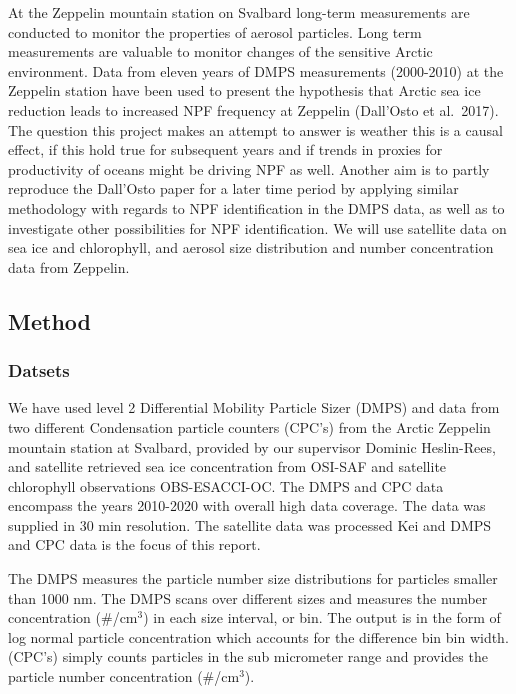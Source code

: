 \documentclass[11pt]{article}
\begin{document}
At the Zeppelin mountain station on Svalbard long-term measurements are
conducted to monitor the properties of aerosol particles. Long term
measurements are valuable to monitor changes of the sensitive Arctic
environment. Data from eleven years of DMPS measurements (2000-2010) at
the Zeppelin station have been used to present the hypothesis that
Arctic sea ice reduction leads to increased NPF frequency at Zeppelin
(Dall'Osto et al.~2017). The question this project makes an attempt to
answer is weather this is a causal effect, if this hold true for
subsequent years and if trends in proxies for productivity of oceans
might be driving NPF as well. Another aim is to partly reproduce the
Dall'Osto paper for a later time period by applying similar methodology
with regards to NPF identification in the DMPS data, as well as to
investigate other possibilities for NPF identification. We will use
satellite data on sea ice and chlorophyll, and aerosol size distribution
and number concentration data from Zeppelin.

    \hypertarget{method}{%
\subsection{Method}\label{method}}

\hypertarget{datsets}{%
\subsubsection{Datsets}\label{datsets}}

We have used level 2 Differential Mobility Particle Sizer (DMPS) and
data from two different Condensation particle counters (CPC's) from the
Arctic Zeppelin mountain station at Svalbard, provided by our supervisor
Dominic Heslin-Rees, and satellite retrieved sea ice concentration from
OSI-SAF and satellite chlorophyll observations OBS-ESACCI-OC. The DMPS
and CPC data encompass the years 2010-2020 with overall high data
coverage. The data was supplied in 30 min resolution. The satellite data
was processed Kei and DMPS and CPC data is the focus of this report.

The DMPS measures the particle number size distributions for particles
smaller than 1000 nm. The DMPS scans over different sizes and measures
the number concentration (\#/cm\(^3\)) in each size interval, or bin.
The output is in the form of log normal particle concentration which
accounts for the difference bin bin width. (CPC's) simply counts
particles in the sub micrometer range and provides the particle number
concentration (\#/cm\(^3\)).
\end{document}

